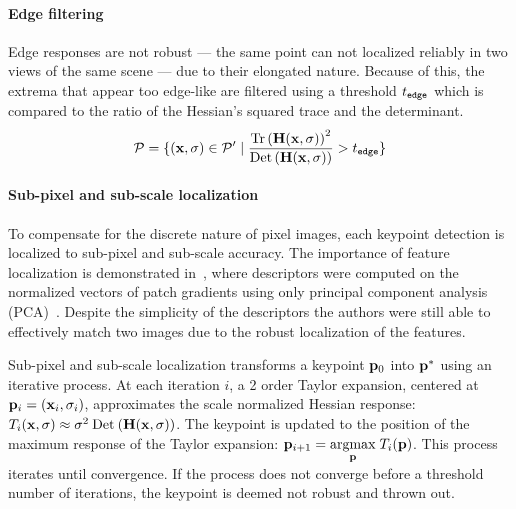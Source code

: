         \paragraph{Edge filtering}
            Edge responses are not robust --- \ie{} the same point can
              not localized reliably in two views of the same scene ---
              due to their elongated nature.
            Because of this, the extrema that appear too edge-like are
              filtered using a threshold $t_{\tt{edge}}$ which is
              compared to the ratio of the Hessian's squared trace and
              the determinant.
            \begin{equation}
                \mathcal{P} = \{(\mathbf{x}, \sigma) \in \mathcal{P}' \mid
                  \frac{\mathbin{\textrm{Tr}}\left(\mathbf{H}(\mathbf{x}, \sigma)\right)^2}{\mathbin{\textrm{Det}}\left(\mathbf{H}(\mathbf{x}, \sigma)\right)} > t_{\tt{edge}}\}
            \end{equation}

        \paragraph{Sub-pixel and sub-scale localization}
            To compensate for the discrete nature of pixel images, each
              keypoint detection is localized to sub-pixel and sub-scale
              accuracy.
            The importance of feature localization is demonstrated
              in~\cite{ke_pcasift_2004}, where descriptors were computed
              on the normalized vectors of patch gradients using only
              principal component analysis
              (PCA)~\cite{jolliffe_principal_2014}.
            Despite the simplicity of the descriptors the authors were
              still able to effectively match two images due to the
              robust localization of the features.

            Sub-pixel and sub-scale localization transforms a keypoint
              $\mathbf{p}_0$ into $\mathbf{p}^*$ using an iterative process.
            At each iteration $i$, a 2\nd{} order Taylor expansion,
              centered at $\mathbf{p}_i = (\mathbf{x}_i, \sigma_i)$, approximates the
              scale normalized Hessian response:
            $T_i(\mathbf{x}, \sigma) \approx \sigma^2 \mathbin{\textrm{Det}}\left(\mathbf{H}(\mathbf{x}, \sigma)\right)$.
            The keypoint is updated to the position of the maximum
              response of the Taylor expansion:
            $\mathbf{p}_{i + 1} = \underset{\mathbf{p}}{\operatorname{argmax}}\; T_i(\mathbf{p})$.
            This process iterates until convergence.
            If the process does not converge before a threshold number
              of iterations, the keypoint is deemed not robust and thrown
              out.

